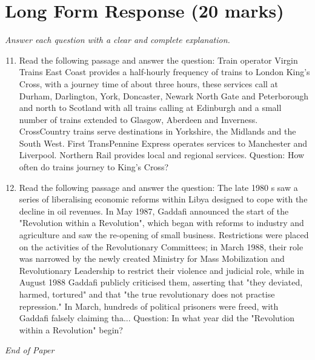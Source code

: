 \documentclass[12pt]{article}
\begin{document}
\section*{Long Form Response (20 marks)}
\textit{Answer each question with a clear and complete explanation.}
\begin{enumerate}[label=\arabic*.]
\setcounter{enumi}{10}
\item Read the following passage and answer the question: Train operator Virgin Trains East Coast provides a half-hourly frequency of trains to London King's Cross, with a journey time of about three hours, these services call at Durham, Darlington, York, Doncaster, Newark North Gate and Peterborough and north to Scotland with all trains calling at Edinburgh and a small number of trains extended to Glasgow, Aberdeen and Inverness. CrossCountry trains serve destinations in Yorkshire, the Midlands and the South West. First TransPennine Express operates services to Manchester and Liverpool. Northern Rail provides local and regional services. Question: How often do trains journey to King's Cross?
\item Read the following passage and answer the question: The late 1980 s saw a series of liberalising economic reforms within Libya designed to cope with the decline in oil revenues. In May 1987, Gaddafi announced the start of the "Revolution within a Revolution", which began with reforms to industry and agriculture and saw the re-opening of small business. Restrictions were placed on the activities of the Revolutionary Committees; in March 1988, their role was narrowed by the newly created Ministry for Mass Mobilization and Revolutionary Leadership to restrict their violence and judicial role, while in August 1988 Gaddafi publicly criticised them, asserting that "they deviated, harmed, tortured" and that "the true revolutionary does not practise repression." In March, hundreds of political prisoners were freed, with Gaddafi falsely claiming tha... Question: In what year did the "Revolution within a Revolution" begin?
\end{enumerate}

\vfill
\noindent\textit{End of Paper}
\end{document}
